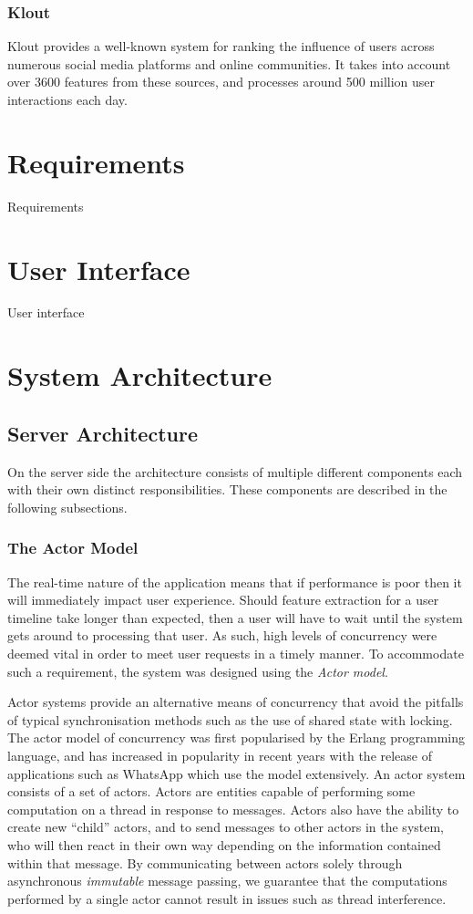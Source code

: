 \documentclass{l4proj}
\begin{document}
\subsection{Klout}
Klout provides a well-known system for ranking the influence of users across numerous social media platforms and online communities. It takes into account over 3600 features from these sources, and processes around 500 million user interactions each day.


\chapter{Requirements}
Requirements

\chapter{User Interface}
User interface

\chapter{System Architecture}

    \section{Server Architecture}

On the server side the architecture consists of multiple different components each with their own distinct responsibilities. These components are described in the following subsections.

        \subsection{The Actor Model}
The real-time nature of the application means that if performance is poor then it will immediately impact user experience. Should feature extraction for a user timeline take longer than expected, then a user will have to wait until the system gets around to processing that user. As such, high levels of concurrency were deemed vital in order to meet user requests in a timely manner. To accommodate such a requirement, the system was designed using the \textit{Actor model}.

Actor systems provide an alternative means of concurrency that avoid the pitfalls of typical synchronisation methods such as the use of shared state with locking. The actor model of concurrency was first popularised by the Erlang programming language, and has increased in popularity in recent years with the release of applications such as WhatsApp which use the model extensively. An actor system consists of a set of actors. Actors are entities capable of performing some computation on a thread in response to messages. Actors also have the ability to create new “child” actors, and to send messages to other actors in the system, who will then react in their own way depending on the information contained within that message. By communicating between actors solely through asynchronous \textit{immutable} message passing, we guarantee that the computations performed by a single actor cannot result in issues such as thread interference.
\end{document}
